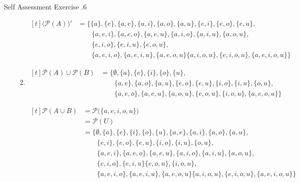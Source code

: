 \documentclass[../notes.tex]{subfiles}
\begin{document}
\begin{exercise}{Self Assessment Exercise \thechapter.6}
\begin{enumerate}
\begin{enumerate}[label=(\alph*), labelsep=1em]
								$\begin{aligned}[t]
									\bigl(\mathcal{P}(A)\bigr)' &= \bigl\{\{a\}, \{e\}, \{a, e\}, \{a, i\}, \{a, o\}, \{a, u\}, \{e, i\}, \{e, o\}, \{e, u\},\\
									& \qquad \{a, e, i\}, \{a, e, o\}, \{a, e, u\}, \{a, i, o\}, \{a, i, u\}, \{a, o, u\}, \\
									& \qquad \{e, i, o\}, \{e, i, u\},  \{e, o, u\}, \\
									& \qquad \{a, e, i, o\}, \{a, e, i, u\}, \{a, e, o, u\} \{a, i, o, u\}, \{e, i, o, u\}, \{a, e, i, o, u\}\bigr\}
								\end{aligned} $
							\item $
								\begin{aligned}[t]
									\mathcal{P}(A) \cup \mathcal{P}(B) &= \bigl\{\emptyset, \{a\}, \{e\}, \{i\}, \{o\}, \{u\},\\
									& \qquad \{a, e\}, \{a, o\}, \{a, u\}, \{e, o\}, \{e, u\}, \{i, o\}, \{i, u\}, \{o, u\}, \\
									& \qquad \{a, e, o\}, \{a, e, u\}, \{a, o, u\}, \{e, o, u\}, \{i, o, u\}, \{a, e, o, u\}\bigr\}
								\end{aligned}$

								$\begin{aligned}[t]
									\mathcal{P}(A \cup B) &= \mathcal{P}\bigl(\{a, e, i, o, u\}\bigr)\\
									&= \mathcal{P}(U)\\
									&= \bigl\{\emptyset, \{a\}, \{e\}, \{i\}, \{o\}, \{u\}, \{a, e\}, \{a, i\}, \{a, o\}, \{a, u\},\\
									& \qquad \{e, i\}, \{e, o\}, \{e, u\}, \{i, o\}, \{i, u\}, \{o, u\},\\
									& \qquad \{a, e, i\}, \{a, e, o\}, \{a, e, u\}, \{a, i, o\}, \{a, i, u\}, \{a, o, u\},\\
									& \qquad \{e, i, o\}, \{e, i, u\} \{e, o, u\}, \{i, o, u\},\\
									& \qquad \{a, e, i, o\}, \{a, e, i, u\}, \{a, e, o, u\} \{a, i, o, u\}, \{e, i, o, u\}, \{a, e, i, o, u\}\bigr\}
								\end{aligned} $
						\end{enumerate}
				\end{enumerate}
			\end{exercise}
\end{document}

